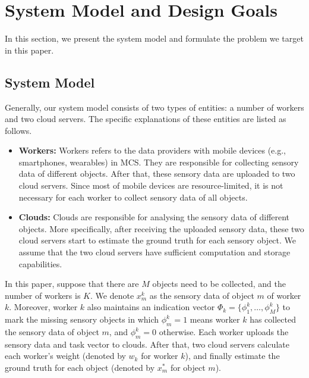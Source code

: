 \documentclass[conference]{IEEEtran}
\begin{document}
\section{System Model and Design Goals}\label{sec3}

In this section, we present the system model and formulate the problem we target in this paper.
\subsection{System Model}\label{sec3-A}

Generally, our system model consists of two types of entities: a number of workers and two cloud servers. %
The specific explanations of these entities are listed as follows.
\begin{itemize}
  \item \textbf{Workers:} Workers refers to the data providers with mobile devices (e.g., smartphones, wearables) in MCS. They are responsible for collecting sensory data of different objects. After that, these sensory data are uploaded to two cloud servers.  Since most of mobile devices are resource-limited, it is not necessary for each worker to collect sensory data of all objects.
  \item \textbf{Clouds:} Clouds are responsible for analysing the sensory data of different objects. More specifically, after receiving the uploaded sensory data, these two cloud servers start to estimate the ground truth for each sensory object. We assume that the two cloud servers have sufficient computation and storage capabilities.
\end{itemize}
In this paper, suppose that there are $M$ objects need to be collected, and the number of workers is $K$.
We denote $x_m^k$ as the sensory data of object $m$ of worker $k$.
Moreover, worker $k$ also maintains an indication vector $\Phi_k = \{\phi_1^k, \ldots, \phi_M^k\}$ to mark the missing sensory objects in which $\phi_m^k = 1$ means worker $k$ has collected the sensory data of object $m$, and $\phi_m^k = 0$ otherwise.
Each worker uploads the sensory data and task vector to clouds.
After that, two cloud servers calculate each worker's weight (denoted by $w_k$ for worker $k$), and finally estimate the ground truth for each object (denoted by $x_m^*$ for object $m$). 
\end{document}
